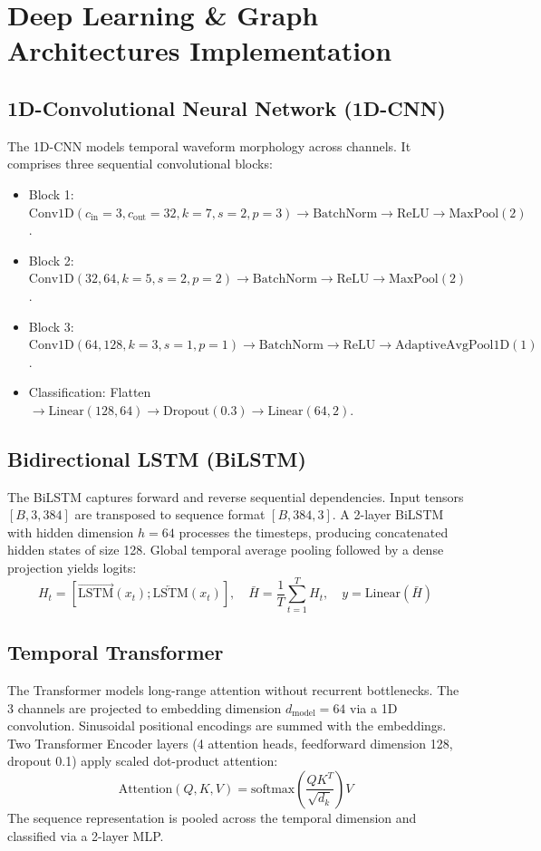 \documentclass[conference]{IEEEtran}
\begin{document}
\section{Deep Learning \& Graph Architectures Implementation}

\subsection{1D-Convolutional Neural Network (1D-CNN)}
The 1D-CNN models temporal waveform morphology across channels. It comprises three sequential convolutional blocks:
\begin{itemize}
    \item Block 1: $\text{Conv1D}(c_{\text{in}}=3, c_{\text{out}}=32, k=7, s=2, p=3) \rightarrow \text{BatchNorm} \rightarrow \text{ReLU} \rightarrow \text{MaxPool}(2)$.
    \item Block 2: $\text{Conv1D}(32, 64, k=5, s=2, p=2) \rightarrow \text{BatchNorm} \rightarrow \text{ReLU} \rightarrow \text{MaxPool}(2)$.
    \item Block 3: $\text{Conv1D}(64, 128, k=3, s=1, p=1) \rightarrow \text{BatchNorm} \rightarrow \text{ReLU} \rightarrow \text{AdaptiveAvgPool1D}(1)$.
    \item Classification: Flatten $\rightarrow \text{Linear}(128, 64) \rightarrow \text{Dropout}(0.3) \rightarrow \text{Linear}(64, 2)$.
\end{itemize}

\subsection{Bidirectional LSTM (BiLSTM)}
The BiLSTM captures forward and reverse sequential dependencies. Input tensors $[B, 3, 384]$ are transposed to sequence format $[B, 384, 3]$. A 2-layer BiLSTM with hidden dimension $h=64$ processes the timesteps, producing concatenated hidden states of size 128. Global temporal average pooling followed by a dense projection yields logits:
\begin{equation}
H_t = [\overrightarrow{\text{LSTM}}(x_t); \overleftarrow{\text{LSTM}}(x_t)], \quad \bar{H} = \frac{1}{T}\sum_{t=1}^T H_t, \quad y = \text{Linear}(\bar{H})
\end{equation}

\subsection{Temporal Transformer}
The Transformer models long-range attention without recurrent bottlenecks. The 3 channels are projected to embedding dimension $d_{\text{model}} = 64$ via a 1D convolution. Sinusoidal positional encodings are summed with the embeddings. Two Transformer Encoder layers (4 attention heads, feedforward dimension 128, dropout 0.1) apply scaled dot-product attention:
\begin{equation}
\text{Attention}(Q, K, V) = \text{softmax}\left(\frac{QK^T}{\sqrt{d_k}}\right)V
\end{equation}
The sequence representation is pooled across the temporal dimension and classified via a 2-layer MLP.
\end{document}
